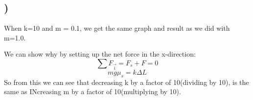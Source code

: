 \documentclass[a4paper,10pt,norsk]{article}
\begin{document}
\subsection{)}
When k=10 and m = 0.1, we get the same graph and result as we did with m=1.0.

We can show why by setting up the net force in the x-direction:
\[\sum F_{\vec{i}} = F_{s} + F = 0\]
\[mg\mu_{s} = k\Delta L\]
So from this we can see that decreasing k by a factor of 10(dividing by 10), is the same as INcreasing m by a factor of 10(multiplying by 10).
\end{document}
